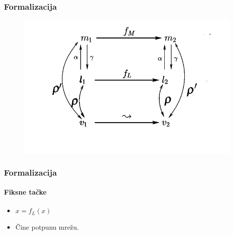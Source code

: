 \documentclass[xetex,mathserif,serif]{beamer}
\begin{document}
  \begin{frame}
    \frametitle{Formalizacija}
    \begin{figure}
		\begin{center}
		\includegraphics[scale=0.5]{Rho_prime.png}
		\end{center}
	\end{figure}
  \end{frame}
  \begin{frame}
    \frametitle{Formalizacija}
    \framesubtitle{Fiksne tačke}
	\begin{center}
		\begin{itemize}
			\item $x = f_{L}(x)$
			\item Čine potpunu mrežu.
		\end{itemize}
		\end{center}
  \end{frame}
\end{document}
